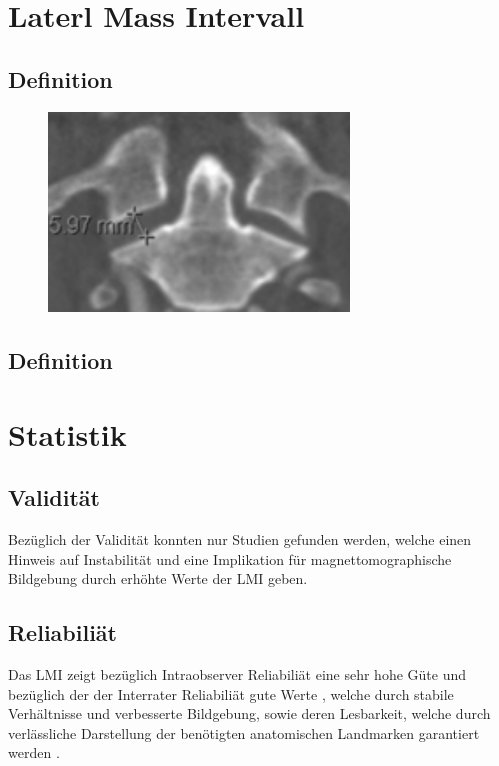 \documentclass{report}
\begin{document}
\section{Laterl Mass Intervall}
\subsection{Definition}

\begin{figure}[h]
        \includegraphics[width=8cm]{LMI.png}
\end{figure}
\subsection{Definition}

\section{Statistik}
\subsection{Validität}
Bezüglich der Validität konnten nur Studien gefunden werden, welche einen Hinweis auf Instabilität und eine Implikation für magnettomographische Bildgebung durch erhöhte Werte der LMI geben. \cite{Chaput2011,Gonzalez2004,Radcliff2010}


\subsection{Reliabiliät}
Das LMI zeigt bezüglich Intraobserver Reliabiliät eine sehr hohe Güte und bezüglich der der Interrater Reliabiliät gute Werte \cite{Chaput2011}, welche durch stabile Verhältnisse und verbesserte Bildgebung, sowie deren Lesbarkeit, welche durch verlässliche Darstellung der benötigten anatomischen Landmarken garantiert werden \cite{Radcliff2010}.
\end{document}
